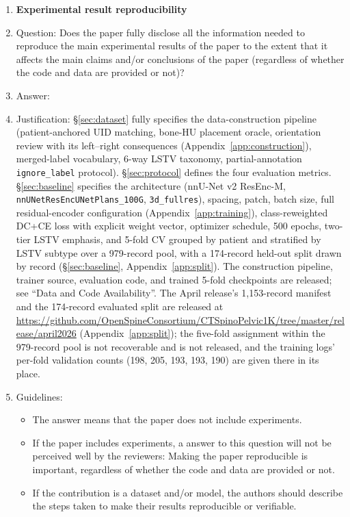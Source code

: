 \begin{enumerate}
    \item {\bf Experimental result reproducibility}
    \item[] Question: Does the paper fully disclose all the information needed to reproduce the main experimental results of the paper to the extent that it affects the main claims and/or conclusions of the paper (regardless of whether the code and data are provided or not)?
    \item[] Answer: \answerYes{}
    \item[] Justification: \S\ref{sec:dataset} fully specifies the data-construction pipeline (patient-anchored UID matching, bone-HU placement oracle, orientation review with its left--right consequences (Appendix~\ref{app:construction}), merged-label vocabulary, 6-way LSTV taxonomy, partial-annotation \texttt{ignore\_label} protocol). \S\ref{sec:protocol} defines the four evaluation metrics. \S\ref{sec:baseline} specifies the architecture (nnU-Net v2 ResEnc-M, \texttt{nnUNetResEncUNetPlans\_100G}, \texttt{3d\_fullres}), spacing, patch, batch size, full residual-encoder configuration (Appendix~\ref{app:training}), class-reweighted DC+CE loss with explicit weight vector, optimizer schedule, 500 epochs, two-tier LSTV emphasis, and 5-fold CV grouped by patient and stratified by LSTV subtype over a 979-record pool, with a 174-record held-out split drawn by record (\S\ref{sec:baseline}, Appendix~\ref{app:split}). The construction pipeline, trainer source, evaluation code, and trained 5-fold checkpoints are released; see ``Data and Code Availability''. The April release's 1{,}153-record manifest and the 174-record evaluated split are released at \url{https://github.com/OpenSpineConsortium/CTSpinoPelvic1K/tree/master/release/april2026} (Appendix~\ref{app:split}); the five-fold assignment within the 979-record pool is not recoverable and is not released, and the training logs' per-fold validation counts (198, 205, 193, 193, 190) are given there in its place.
    \item[] Guidelines:
    \begin{itemize}
        \item The answer \answerNA{} means that the paper does not include experiments.
        \item If the paper includes experiments, a \answerNo{} answer to this question will not be perceived well by the reviewers: Making the paper reproducible is important, regardless of whether the code and data are provided or not.
        \item If the contribution is a dataset and\slash or model, the authors should describe the steps taken to make their results reproducible or verifiable.

\end{itemize}
\end{enumerate}
